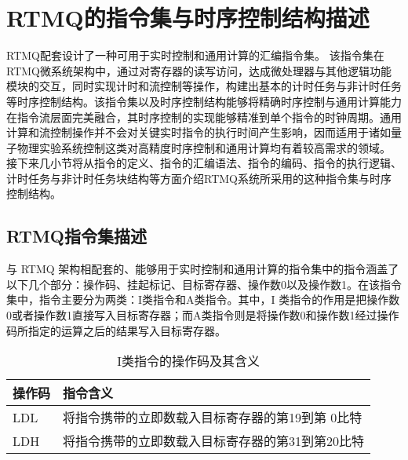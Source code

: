 


\section[RTMQ的指令集与时序控制结构描述]{RTMQ的指令集与时序控制结构描述\label{section:rtmq_instructions}}
RTMQ配套设计了一种可用于实时控制和通用计算的汇编指令集\cite[]{junhua03}。
该指令集在RTMQ微系统架构中，通过对寄存器的读写访问，达成微处理器与其他逻辑功能模块的交互，同时实现计时和流控制等操作，构建出基本的计时任务与非计时任务等时序控制结构。该指令集以及时序控制结构能够将精确时序控制与通用计算能力在指令流层面完美融合，其时序控制的实现能够精准到单个指令的时钟周期。通用计算和流控制操作并不会对关键实时指令的执行时间产生影响，因而适用于诸如量子物理实验系统控制这类对高精度时序控制和通用计算均有着较高需求的领域。
接下来几小节将从指令的定义、指令的汇编语法、指令的编码、指令的执行逻辑、计时任务与非计时任务块结构等方面介绍RTMQ系统所采用的这种指令集与时序控制结构。

\subsection[RTMQ指令集描述]{RTMQ指令集描述\label{section:rtmq_instruction_set}}


与 RTMQ 架构相配套的、能够用于实时控制和通用计算的指令集中的指令涵盖了以下几个部分：操作码、挂起标记、目标寄存器、操作数0以及操作数1。在该指令集中，指令主要分为两类：I类指令和A类指令。其中，I 类指令的作用是把操作数0或者操作数1直接写入目标寄存器；而A类指令则是将操作数0和操作数1经过操作码所指定的运算之后的结果写入目标寄存器。


\begin{table}
    \centering
    \caption[I类指令的操作码及其含义]{I类指令的操作码及其含义\label{tb:i_instructions}}
    \begin{tabular}{C{2cm}|C{12cm}}
        \toprule
        操作码 & 指令含义 \\
        \midrule
        LDL & 将指令携带的立即数载入目标寄存器的第19到第 0比特\\
        LDH & 将指令携带的立即数载入目标寄存器的第31到第20比特\\
        \bottomrule
    \end{tabular}
\end{table}

